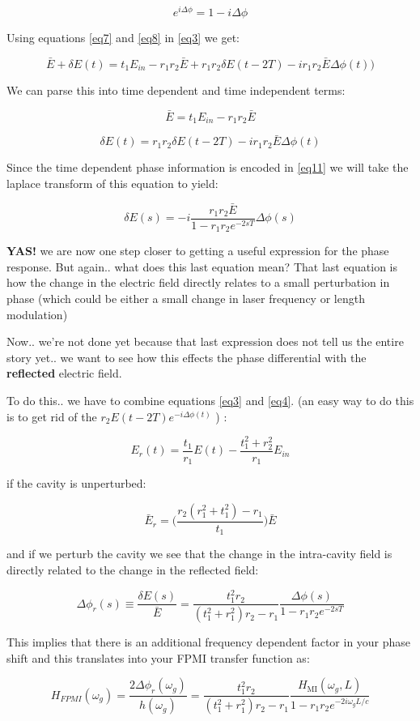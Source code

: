 \[ e^{i\Delta \phi} = 1- i \Delta \phi \]

Using equations \ref{eq7} and \ref{eq8} in \ref{eq3} we get:

\[ \bar{E} + \delta E(t) = t_1 E_{in} -r_1r_2\bar{E} + r_1r_2 \delta E(t-2T) - ir_1r_2\bar{E}\Delta \phi(t)) \]

We can parse this into time dependent and time independent terms:

\[ \bar{E} = t_1 E_{in} -r_1r_2\bar{E} \]

\[ \delta E(t) = r_1r_2 \delta E(t-2T) - ir_1r_2\bar{E}\Delta \phi(t) \]

Since the time dependent phase information is encoded in \ref{eq11} we
will take the laplace transform of this equation to yield:

\[\delta E(s) = -i \frac{r_1r_2 \bar{E}}{1-r_1r_2e^{-2sT}} \Delta \phi(s)\]

\textbf{YAS!} we are now one step closer to getting a useful expression
for the phase response. But again.. what does this last equation mean?
That last equation is how the change in the electric field directly
relates to a small perturbation in phase (which could be either a small
change in laser frequency or length modulation)

Now.. we're not done yet because that last expression does not tell us
the entire story yet.. we want to see how this effects the phase
differential with the \textbf{reflected} electric field.

To do this.. we have to combine equations \ref{eq3} and \ref{eq4}. (an
easy way to do this is to get rid of the $ r_2 E(t - 2T) e^{-i \Delta \phi(t)} $ ) :

\[ E_r(t) = \frac{t_1}{r_1}E(t) - \frac{t_1^2 + r_2^2}{r_1} E_{in}\]

if the cavity is unperturbed:

\[ \bar{E}_r = \bigg(\frac{r_2(r_1^2 + t_1^2) - r_1}{t_1} \bigg) \bar{E} \]

and if we perturb the cavity we see that the change in the intra-cavity
field is directly related to the change in the reflected field:

\[ \Delta \phi_r(s) \equiv \frac{\delta E(s)}{\bar{E}} = \frac{t_1^2r_2}{(t_1^2 + r_1^2)r_2 -r_1} \frac{\Delta \phi(s)}{1-r_1r_2e^{-2sT}}\]

This implies that there is an additional frequency dependent factor in
your phase shift and this translates into your FPMI transfer function
as:

\[ H_{FPMI}(\omega_g) = \frac{2 \Delta \phi_r(\omega_g)}{h(\omega_g)} =  \frac{t_1^2r_2}{(t_1^2 + r_1^2)r_2 -r_1} \frac{H_{\mathrm{MI}}(\omega_g, L)}{1-r_1r_2e^{-2i \omega_g L /c }}  \]

